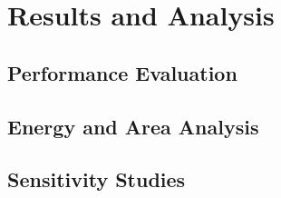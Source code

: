 \section{Results and Analysis}

\subsection{Performance Evaluation}

\subsection{Energy and Area Analysis}

\subsection{Sensitivity Studies}

